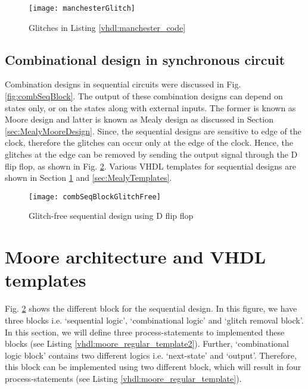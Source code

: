 \begin{figure}[!h]
	\centering
	\texttt{[image: manchesterGlitch]}
	\caption{Glitches in Listing \ref{vhdl:manchester_code}}
	\label{fig:manchesterGlitch}
\end{figure}





\subsection{Combinational design in synchronous circuit}\label{sec:glitchInsSync}
Combination designs in sequential circuits were discussed in Fig. \ref{fig:combSeqBlock}. The output of these combination designs can depend on states only, or on the states along with external inputs. The former is known as Moore design and latter is known as Mealy design as discussed in Section \ref{sec:MealyMooreDesign}. Since, the sequential designs are sensitive to edge of the clock, therefore the glitches can occur only at the edge of the clock. Hence, the glitches at the edge can be removed by sending the output signal through the D flip flop, as shown in Fig. \ref{fig:combSeqBlockGlitchFree}. Various VHDL templates for sequential designs are shown in Section \ref{sec:MooreTemplates} and \ref{sec:MealyTemplates}. 

\begin{figure}[!h]
	\centering
	\texttt{[image: combSeqBlockGlitchFree]}
	\caption{Glitch-free sequential design using D flip flop}
	\label{fig:combSeqBlockGlitchFree}
\end{figure}


\section{Moore architecture and VHDL templates} \label{sec:MooreTemplates}
Fig. \ref{fig:combSeqBlockGlitchFree} shows the different block for the sequential design. In this figure, we have three blocks i.e. `sequential logic', `combinational logic' and `glitch removal block'. In this section, we will define three process-statements to implemented these blocks (see Listing \ref{vhdl:moore_regular_template2}). Further, `combinational logic block' contains two different logics i.e. `next-state' and `output'. Therefore, this block can be implemented using two different block, which will result in four process-statements (see Listing \ref{vhdl:moore_regular_template}). 

